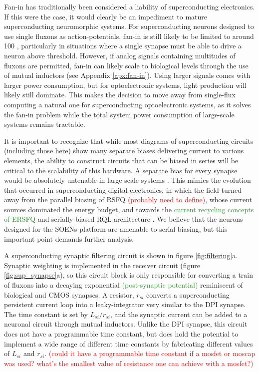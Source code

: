 \documentclass[twocolumn]{article}
\begin{document}
Fan-in has traditionally been considered a liability of superconducting electronics. If this were the case, it would clearly be an impediment to mature superconducting neuromorphic systems. For superconducting neurons designed to use single fluxons as action-potentials, fan-in is still likely to be limited to around 100 \cite{schneider2020fan}, particularly in situations where a single synapse must be able to drive a neuron above threshold. However, if analog signals containing multitudes of fluxons are permitted, fan-in can likely scale to biological levels through the use of mutual inductors (see Appendix \ref{apx:fan-in}). Using larger signals comes with larger power consumption, but for optoelectronic systems, light production will likely still dominate. This makes the decision to move away from single-flux computing a natural one for superconducting optoelectronic systems, as it solves the fan-in problem while the total system power consumption of large-scale systems remains tractable.

It is important to recognize that while most diagrams of superconducting circuits (including those here) show many separate biases delivering current to various elements, the ability to construct circuits that can be biased in series will be critical to the scalability of this hardware. A separate bias for every synapse would be absolutely untenable in large-scale systems \cite{sergey}. This mimics the evolution that occurred in superconducting digital electronics, in which the field turned away from the parallel biasing of RSFQ \textcolor{red}{(probably need to define)}, whose current sources dominated the energy budget, and towards the \textcolor{ForestGreen}{current recycling concepts of ERSFQ \cite{kisa2011}} and serially-biased RQL architecture \cite{tolpygo2016superconductor}. We believe that the neurons designed for the SOENs platform are amenable to serial biasing, but this important point demands further analysis.

A superconducting synaptic filtering circuit is shown in figure \ref{fig:filtering}a. Synaptic weighting is implemented in the receiver circuit (figure \ref{fig:sup_synapse}a), so this circuit block is only responsible for converting a train of fluxons into a decaying exponential \textcolor{ForestGreen}{(post-synaptic potential)} reminiscent of biological and CMOS synapses. A resistor, $r_{si}$ converts a superconducting persistent current loop into a leaky-integrator very similar to the DPI synapse. The time constant is set by $L_{si}/r_{si}$, and the synaptic current can be added to a neuronal circuit through mutual inductors. Unlike the DPI synapse, this circuit does not have a programmable time constant, but does hold the potential to implement a wide range of different time constants by fabricating different values of $L_{si}$ and $r_{si}$. \textcolor{red}{(could it have a programmable time constant if a mosfet or moscap was used? what's the smallest value of resistance one can achieve with a mosfet?)}
\end{document}

